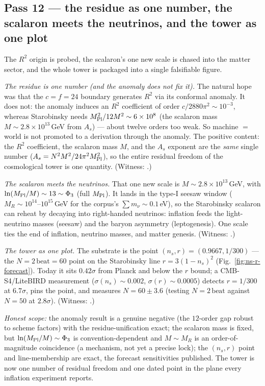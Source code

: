 \documentclass[11pt]{article}
\begin{document}
\subsection{Pass 12 --- the residue as one number, the scalaron meets the neutrinos, and the tower as one plot}
\label{sec:capstone-twelve}

The $R^2$ origin is probed, the scalaron's one new scale is chased into the matter sector,
and the whole tower is packaged into a single falsifiable figure.

\emph{The residue is one number (and the anomaly does not fix it).} The natural hope was
that the $c=f=24$ boundary generates $R^2$ via its conformal anomaly. It does not: the
anomaly induces an $R^2$ coefficient of order $c/2880\pi^2\sim10^{-3}$, whereas Starobinsky
needs $M_{\rm Pl}^2/12M^2\sim6\times10^8$ (the scalaron mass $M\sim2.8\times10^{13}$\,GeV
from $A_s$) --- about twelve orders too weak. So machine $=$ world is not promoted to a
derivation through the anomaly. The positive content: the $R^2$ coefficient, the scalaron
mass $M$, and the $A_s$ exponent are the \emph{same} single number ($A_s=N^2M^2/24\pi^2
M_{\rm Pl}^2$), so the entire residual freedom of the cosmological tower is one quantity.
(Witness: .)

\emph{The scalaron meets the neutrinos.} That one new scale is $M\sim2.8\times10^{13}$\,GeV,
with $\ln(M_{\rm Pl}/M)\sim13\sim\Phi_3$ (full $M_{\rm Pl}$). It lands in the type-I seesaw
window ($M_R\sim10^{14}$--$10^{15}$\,GeV for the corpus's $\sum m_\nu\sim0.1$\,eV), so the
Starobinsky scalaron can reheat by decaying into right-handed neutrinos: inflation feeds the
light-neutrino masses (seesaw) and the baryon asymmetry (leptogenesis). One scale ties the
end of inflation, neutrino masses, and matter genesis. (Witness:
.)

\emph{The tower as one plot.} The substrate is the point $(n_s,r)=(0.9667,1/300)$ --- the
$N=2\,\mathrm{beat}=60$ point on the Starobinsky line $r=3(1-n_s)^2$ (Fig.~\ref{fig:ns-r-forecast}).
Today it sits $0.42\sigma$ from Planck and below the $r$ bound; a CMB-S4/LiteBIRD measurement
($\sigma(n_s)\sim0.002$, $\sigma(r)\sim0.0005$) detects $r=1/300$ at $6.7\sigma$, pins the
point, and measures $N=60\pm3.6$ (testing $N=2\,\mathrm{beat}$ against $N=50$ at $2.8\sigma$).
(Witness: .)



\emph{Honest scope:} the anomaly result is a genuine negative (the $12$-order gap robust to
scheme factors) with the residue-unification exact; the scalaron mass is fixed, but
$\ln(M_{\rm Pl}/M)\sim\Phi_3$ is convention-dependent and $M\sim M_R$ is an order-of-magnitude
coincidence (a mechanism, not yet a precise lock); the $(n_s,r)$ point and line-membership
are exact, the forecast sensitivities published. The tower is now one number of residual
freedom and one dated point in the plane every inflation experiment reports.
\end{document}
